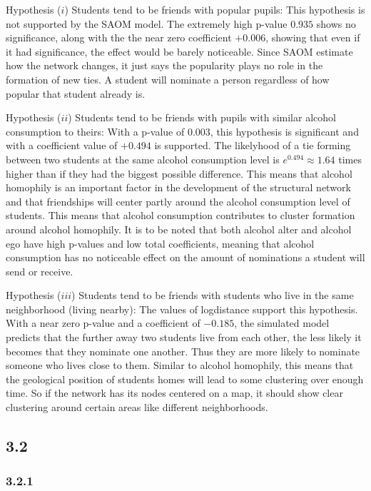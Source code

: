 \documentclass[
]{article}
\begin{document}
Hypothesis (\(i\)) Students tend to be friends with popular pupils: This
hypothesis is not supported by the SAOM model. The extremely high
p-value \(0.935\) shows no significance, along with the the near zero
coefficient \(+0.006\), showing that even if it had significance, the
effect would be barely noticeable. Since SAOM estimate how the network
changes, it just says the popularity plays no role in the formation of
new ties. A student will nominate a person regardless of how popular
that student already is.

Hypothesis (\(ii\)) Students tend to be friends with pupils with similar
alcohol consumption to theirs: With a p-value of \(0.003\), this
hypothesis is significant and with a coefficient value of \(+0.494\) is
supported. The likelyhood of a tie forming between two students at the
same alcohol consumption level is \(e^{0.494} \approx 1.64\) times
higher than if they had the biggest possible difference. This means that
alcohol homophily is an important factor in the development of the
structural network and that friendships will center partly around the
alcohol consumption level of students. This means that alcohol
consumption contributes to cluster formation around alcohol homophily.
It is to be noted that both alcohol alter and alcohol ego have high
p-values and low total coefficients, meaning that alcohol consumption
has no noticeable effect on the amount of nominations a student will
send or receive.

Hypothesis (\(iii\)) Students tend to be friends with students who live
in the same neighborhood (living nearby): The values of logdistance
support this hypothesis. With a near zero p-value and a coefficient of
\(-0.185\), the simulated model predicts that the further away two
students live from each other, the less likely it becomes that they
nominate one another. Thus they are more likely to nominate someone who
lives close to them. Similar to alcohol homophily, this means that the
geological position of students homes will lead to some clustering over
enough time. So if the network has its nodes centered on a map, it
should show clear clustering around certain areas like different
neighborhoods.

\subsection{3.2}\label{section-15}

\subsubsection{3.2.1}\label{section-16}
\end{document}
